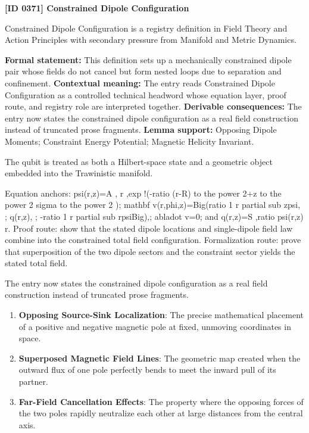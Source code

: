 \clearpage
\noindent\textbf{[ID 0371] Constrained Dipole Configuration}\par
\vspace{0.35em}
\begingroup\small
{}
Constrained Dipole Configuration is a registry definition in Field Theory and Action Principles with secondary pressure from Manifold and Metric Dynamics.

\begingroup\footnotesize\setlength{\emergencystretch}{3em}\sloppy
\textbf{Formal statement:} This definition sets up a mechanically constrained dipole pair whose fields do not cancel but form nested loops due to separation and confinement. \textbf{Contextual meaning:} The entry reads Constrained Dipole Configuration as a controlled technical headword whose equation layer, proof route, and registry role are interpreted together. \textbf{Derivable consequences:} The entry now states the constrained dipole configuration as a real field construction instead of truncated prose fragments. \textbf{Lemma support:} Opposing Dipole Moments; Constraint Energy Potential; Magnetic Helicity Invariant.\par
\endgroup

The qubit is treated as both a Hilbert-space state and a geometric object embedded into the Trawinistic manifold.

Equation anchors: psi(r,z)=A , r ,exp !(-ratio (r-R) to the power 2+z to the power 2 sigma to the power 2 ); mathbf v(r,phi,z)=Big(ratio 1 r partial sub zpsi, ; q(r,z), ; -ratio 1 r partial sub rpsiBig),; abladot v=0; and q(r,z)=S ,ratio psi(r,z) r. Proof route: show that the stated dipole locations and single-dipole field law combine into the constrained total field configuration. Formalization route: prove that superposition of the two dipole sectors and the constraint sector yields the stated total field.

The entry now states the constrained dipole configuration as a real field construction instead of truncated prose fragments.
\endgroup

\begin{enumerate}[leftmargin=1.6em,itemsep=6pt,topsep=4pt]
\item \textbf{Opposing Source-Sink Localization}: The precise mathematical placement of a positive and negative magnetic pole at fixed, unmoving coordinates in space.
\item \textbf{Superposed Magnetic Field Lines}: The geometric map created when the outward flux of one pole perfectly bends to meet the inward pull of its partner.
\item \textbf{Far-Field Cancellation Effects}: The property where the opposing forces of the two poles rapidly neutralize each other at large distances from the central axis.
\end{enumerate}

